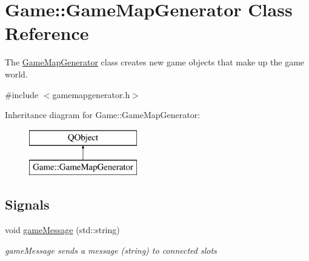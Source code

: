 \hypertarget{class_game_1_1_game_map_generator}{\section{Game\-:\-:Game\-Map\-Generator Class Reference}
\label{class_game_1_1_game_map_generator}
}


The \hyperlink{class_game_1_1_game_map_generator}{Game\-Map\-Generator} class creates new game objects that make up the game world.  




{\ttfamily \#include $<$gamemapgenerator.\-h$>$}

Inheritance diagram for Game\-:\-:Game\-Map\-Generator\-:\begin{figure}[H]
\begin{center}
\leavevmode
\includegraphics[height=2.000000cm]{class_game_1_1_game_map_generator}
\end{center}
\end{figure}
\subsection*{Signals}
\begin{DoxyCompactItemize}
\item 
\hypertarget{class_game_1_1_game_map_generator_a6e6c320ad1d5678db94d4d2092d92dce}{void \hyperlink{class_game_1_1_game_map_generator_a6e6c320ad1d5678db94d4d2092d92dce}{game\-Message} (std\-::string)}\label{class_game_1_1_game_map_generator_a6e6c320ad1d5678db94d4d2092d92dce}

\begin{DoxyCompactList}\small\item\em game\-Message sends a message (string) to connected slots \end{DoxyCompactList}\end{DoxyCompactItemize}
